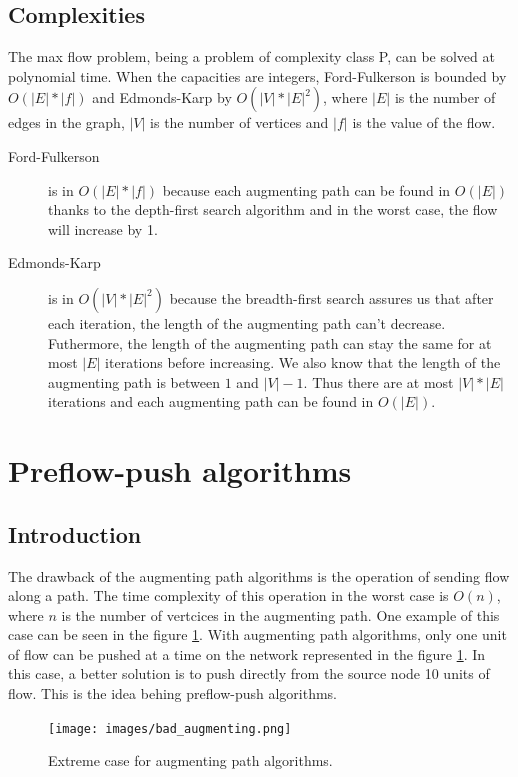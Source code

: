\subsection{Complexities}
The max flow problem, being a problem of complexity class P, can be solved at polynomial time. When the capacities are integers, Ford-Fulkerson is bounded by $O(|E|*|f|)$ and Edmonds-Karp by $O(|V|*|E|^2)$, where $|E|$ is the number of edges in the graph, $|V|$ is the number of vertices and $|f|$ is the value of the flow.

\begin{description}
\item[Ford-Fulkerson]{is in $O(|E|*|f|)$ because each augmenting path can be found in $O(|E|)$ thanks to the depth-first search algorithm and in the worst case, the flow will increase by 1.}
\item[Edmonds-Karp]{is in $O(|V|*|E|^2)$ because the breadth-first search assures us that after each iteration, the length of the augmenting path can't decrease. Futhermore, the length of the augmenting path can stay the same for at most $|E|$ iterations before increasing. We also know that the length of the augmenting path is between $1$ and $|V|-1$. Thus there are at most $|V|*|E|$ iterations and each augmenting path can be found in $O(|E|)$.}
\end{description}


\section{Preflow-push algorithms}

\subsection{Introduction}

The drawback of the augmenting path algorithms is the operation of sending flow along a path. The time complexity of this operation in the worst case is $O(n)$, where $n$ is the number of vertcices in the augmenting path. One example of this case can be seen in the figure \ref{img:bad_augmenting}. With augmenting path algorithms, only one unit of flow can be pushed at a time on the network represented in the figure \ref{img:bad_augmenting}. In this case, a better solution is to push directly from the source node 10 units of flow. This is the idea behing preflow-push algorithms.

\begin{figure}[H]
\centering
\texttt{[image: images/bad\_augmenting.png]}
\caption{Extreme case for augmenting path algorithms.}
\label{img:bad_augmenting}
\end{figure}


